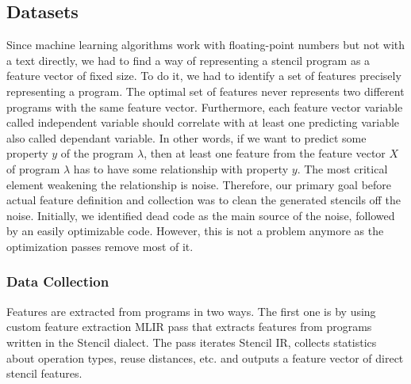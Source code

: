 \documentclass[sigplan,\review anonymous]{acmart}
\begin{document}
\subsection{Datasets}
Since machine learning algorithms work with floating-point numbers but not
with a text directly, we had to find a way of representing a stencil program
as a feature vector of fixed size. To do it, we had to identify a set of
features precisely representing a program. The optimal set of features never
represents two different programs with the same feature vector. Furthermore,
each feature vector variable called independent variable should correlate with
at least one predicting variable also called dependant variable.
In other words, if we want to predict some property $y$ of the program
$\lambda$, then at least one feature from the feature vector $X$ of program
$\lambda$ has to have some relationship with property $y$. The most critical
element weakening the relationship is noise. Therefore, our primary goal
before actual feature definition and collection was to clean the generated
stencils off the noise. Initially, we identified dead code as the main source
of the noise, followed by an easily optimizable code. However, this is not a
problem anymore as the optimization passes remove most of it.

\subsubsection{Data Collection}

Features are extracted from programs in two ways. The first one is by using
custom feature extraction MLIR pass that extracts features from programs
written in the Stencil dialect. The pass iterates Stencil IR, collects
statistics about operation types, reuse distances, etc. and outputs a feature
vector of direct stencil features.
\end{document}
